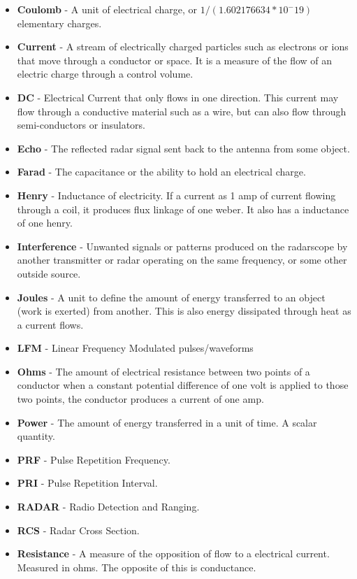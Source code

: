 \documentclass[12pt]{article}
\begin{document}
\begin{itemize}
    \item \textbf{Coulomb} - A unit of electrical charge, or $1 / (1.602176634*10^-19)$ elementary charges. 
    \item \textbf{Current} - A stream of electrically charged particles such as electrons or ions that move through a conductor or space. It is a measure of the flow of an electric charge through a control volume.
    \item \textbf{DC} - Electrical Current that only flows in one direction. This current may flow through a conductive material such as a wire, but can also flow through semi-conductors or insulators. 
    \item \textbf{Echo} - The reflected radar signal sent back to the antenna from some object. 
    \item \textbf{Farad} - The capacitance or the ability to hold an electrical charge. 
    \item \textbf{Henry} - Inductance of electricity. If a current as 1 amp of current flowing through a coil, it produces flux linkage of one weber. It also has a inductance of one henry.
    \item \textbf{Interference} - Unwanted signals or patterns produced on the radarscope by another transmitter or radar operating on the same frequency, or some other outside source. 
    \item \textbf{Joules} - A unit to define the amount of energy transferred to an object (work is exerted) from another. This is also energy dissipated through heat as a current flows. 
    \item \textbf{LFM} - Linear Frequency Modulated pulses/waveforms 
    \item \textbf{Ohms} - The amount of electrical resistance between two points of a conductor when a constant potential difference of one volt is applied to those two points, the conductor produces a current of one amp. 
    \item \textbf{Power} - The amount of energy transferred in a unit of time. A scalar quantity.
    \item \textbf{PRF} - Pulse Repetition Frequency.
    \item \textbf{PRI} - Pulse Repetition Interval.
    \item \textbf{RADAR} - Radio Detection and Ranging.
    \item \textbf{RCS} - Radar Cross Section.
    \item \textbf{Resistance} - A measure of the opposition of flow to a electrical current. Measured in ohms. The opposite of this is conductance.

\end{itemize}
\end{document}
